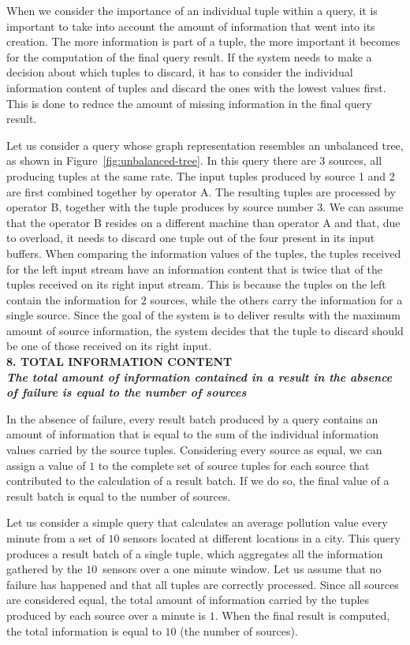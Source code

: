 	
	When we consider the importance of an individual tuple within a query, it is important to take into account the
	amount of information that went into its creation. The more information is part of a tuple, the 
	more important it becomes for the computation of the final query result. If the system needs to make a
	decision about which tuples to discard, it has to consider the individual information content of tuples and
	discard the ones with the lowest values first. This is done to reduce the amount of missing information in
	the final query result. 

Let us consider a query whose graph representation resembles an unbalanced tree, as shown in
\mbox{Figure~\ref{fig:unbalanced-tree}}. In this query there are $3$ sources, all producing tuples at the
same rate. The input tuples produced by source 1 and 2 are first combined together by operator A. The
resulting tuples are processed by operator B, together with the tuple produces by source number $3$.
We can assume that the operator B resides on a different machine than operator A and that, due to
overload, it needs to discard one tuple out of the four present in its input buffers. When comparing the
information values of the tuples, the tuples received for the left input stream have an information
content that is twice that of the tuples received on its right input stream. This is because the tuples
on the left contain the information for $2$ sources, while the others carry the
information for a single source. Since the goal of the system is to deliver results with the maximum
amount of source information, the system decides that the tuple to discard should be one of those
received on its right input. \\

\textbf{8. TOTAL INFORMATION CONTENT \\ \textit{The total amount of information contained in a result in
the absence of failure is equal to the number of sources}}

In the absence of failure, every result batch produced by a query contains an amount of information that
is equal to the sum of the individual information values carried by the source tuples.
Considering every source as equal, we can assign a value of $1$ to the complete set of source tuples for
each source that contributed to the calculation of a result batch. If we do so, the final value of a
result batch is equal to the number of sources.

	Let us consider a simple query that calculates an average pollution value every minute from a set of
	$10$ sensors located at different locations in a city. This query produces a result batch of a single tuple,
	which aggregates all the information gathered by the $10$~sensors over a one minute window. Let us
	assume that no failure has happened and that all tuples are correctly processed. Since all sources are
	considered equal, the total amount of information carried by the tuples produced by each source
	over a minute is $1$. When the final result is computed, the total information is equal
	to $10$ (\ie the number of sources).

